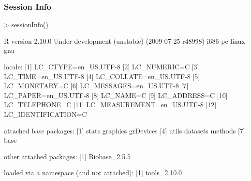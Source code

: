 \begin{frame}
  \frametitle{Session Info}
  \scriptsize
\begin{Schunk}
\begin{Sinput}
> sessionInfo()
\end{Sinput}
\begin{Soutput}
R version 2.10.0 Under development (unstable) (2009-07-25 r48998) 
i686-pc-linux-gnu 

locale:
 [1] LC_CTYPE=en_US.UTF-8      
 [2] LC_NUMERIC=C              
 [3] LC_TIME=en_US.UTF-8       
 [4] LC_COLLATE=en_US.UTF-8    
 [5] LC_MONETARY=C             
 [6] LC_MESSAGES=en_US.UTF-8   
 [7] LC_PAPER=en_US.UTF-8      
 [8] LC_NAME=C                 
 [9] LC_ADDRESS=C              
[10] LC_TELEPHONE=C            
[11] LC_MEASUREMENT=en_US.UTF-8
[12] LC_IDENTIFICATION=C       

attached base packages:
[1] stats     graphics  grDevices
[4] utils     datasets  methods  
[7] base     

other attached packages:
[1] Biobase_2.5.5

loaded via a namespace (and not attached):
[1] tools_2.10.0
\end{Soutput}
\end{Schunk}
\end{frame}


